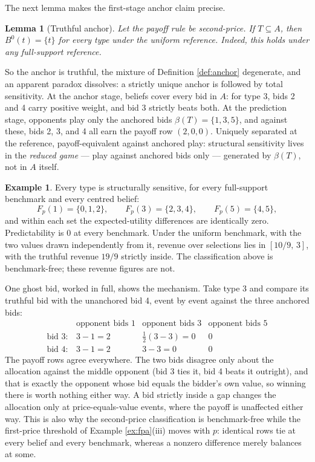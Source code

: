 \documentclass[12pt]{article}
\newtheorem{lemma}{Lemma}
\theoremstyle{definition}
\newtheorem{example}{Example}
\begin{document}
The next lemma makes the first-stage anchor claim precise.

\begin{lemma}[Truthful anchor]\label{lem:truthful}
Let the payoff rule be second-price. If $T \subseteq A$, then $B^0(t) = \{t\}$ for every type under the uniform reference. Indeed, this holds under any full-support reference.
\end{lemma}

So the anchor is truthful, the mixture of Definition \ref{def:anchor} degenerate, and an apparent paradox dissolves: a strictly unique anchor is followed by total sensitivity. At the anchor stage, beliefs cover every bid in $A$: for type 3, bids 2 and 4 carry positive weight, and bid 3 strictly beats both. At the prediction stage, opponents play only the anchored bids $\beta(T) = \{1, 3, 5\}$, and against these, bids 2, 3, and 4 all earn the payoff row $(2, 0, 0)$. Uniquely separated at the reference, payoff-equivalent against anchored play: structural sensitivity lives in the \emph{reduced game} --- play against anchored bids only --- generated by $\beta(T)$, not in $A$ itself.

\begin{example}\label{ex:spa}
Every type is structurally sensitive, for every full-support benchmark and every centred belief:
\[
F_p(1) = \{0, 1, 2\}, \qquad F_p(3) = \{2, 3, 4\}, \qquad F_p(5) = \{4, 5\},
\]
and within each set the expected-utility differences are identically zero. Predictability is $0$ at every benchmark. Under the uniform benchmark, with the two values drawn independently from it, revenue over selections lies in $[10/9,\, 3]$, with the truthful revenue $19/9$ strictly inside. The classification above is benchmark-free; these revenue figures are not. 
\end{example}

One ghost bid, worked in full, shows the mechanism. Take type 3 and compare its truthful bid with the unanchored bid 4, event by event against the three anchored bids:
\[
\begin{array}{lccc}
& \text{opponent bids } 1 & \text{opponent bids } 3 & \text{opponent bids } 5 \\[2pt]
\text{bid } 3: & 3 - 1 = 2 & \tfrac12(3 - 3) = 0 & 0 \\[2pt]
\text{bid } 4: & 3 - 1 = 2 & 3 - 3 = 0 & 0
\end{array}
\]
The payoff rows agree everywhere. The two bids disagree only about the allocation against the middle opponent (bid 3 ties it, bid 4 beats it outright), and that is exactly the opponent whose bid equals the bidder's own value, so winning there is worth nothing either way. A bid strictly inside a gap changes the allocation only at price-equals-value events, where the payoff is unaffected either way. This is also why the second-price classification is benchmark-free while the first-price threshold of Example \ref{ex:fpa}(iii) moves with $p$: identical rows tie at every belief and every benchmark, whereas a nonzero difference merely balances at some.
\end{document}
